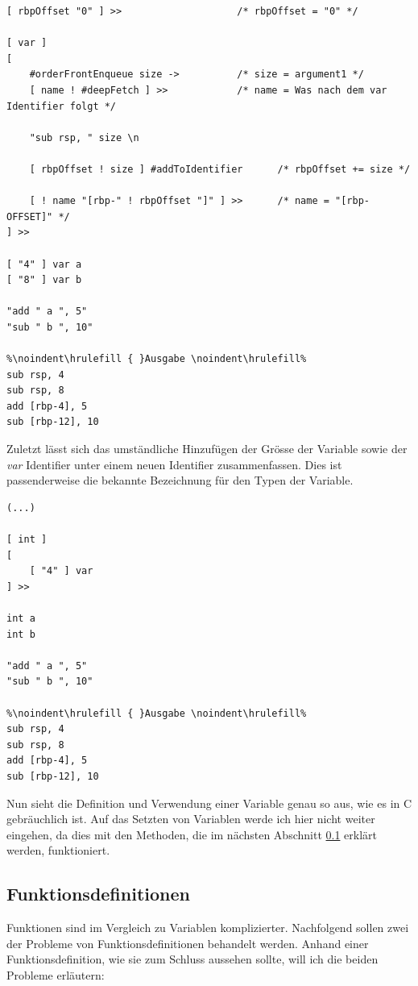 \begin{minipage}{\linewidth}
\begin{lstlisting}[language=QHS, label=eg:qhs-vardefinition, caption=Definition einer Variable mit rbpOffset]
%\noindent\hrulefill { }Eingabe \noindent\hrulefill%
[ rbpOffset "0" ] >>                    /* rbpOffset = "0" */

[ var ]
[
    #orderFrontEnqueue size ->          /* size = argument1 */
    [ name ! #deepFetch ] >>            /* name = Was nach dem var Identifier folgt */

    "sub rsp, " size \n

    [ rbpOffset ! size ] #addToIdentifier      /* rbpOffset += size */

    [ ! name "[rbp-" ! rbpOffset "]" ] >>      /* name = "[rbp-OFFSET]" */
] >> 

[ "4" ] var a 
[ "8" ] var b 

"add " a ", 5"
"sub " b ", 10"
    
%\noindent\hrulefill { }Ausgabe \noindent\hrulefill%
sub rsp, 4
sub rsp, 8
add [rbp-4], 5
sub [rbp-12], 10
\end{lstlisting}
\end{minipage}

Zuletzt lässt sich das umständliche Hinzufügen der Grösse der Variable sowie der \textit{var} Identifier unter einem neuen Identifier zusammenfassen. Dies ist passenderweise die bekannte Bezeichnung für den Typen der Variable.

\begin{lstlisting}[language=QHS, caption=Definition einer Variable mit \textit{int} Identifier]
%\noindent\hrulefill { }Eingabe \noindent\hrulefill%
(...)

[ int ] 
[
    [ "4" ] var
] >>
    
int a 
int b 
    
"add " a ", 5"
"sub " b ", 10"
        
%\noindent\hrulefill { }Ausgabe \noindent\hrulefill%
sub rsp, 4
sub rsp, 8
add [rbp-4], 5
sub [rbp-12], 10
\end{lstlisting}

Nun sieht die Definition und Verwendung einer Variable genau so aus, wie es in C gebräuchlich ist.
Auf das Setzten von Variablen werde ich hier nicht weiter eingehen, da dies mit den Methoden, die im nächsten Abschnitt \ref{sec:qhs-funcs} erklärt werden, funktioniert.

\subsection{Funktionsdefinitionen} \label{sec:qhs-funcs}
Funktionen sind im Vergleich zu Variablen komplizierter. Nachfolgend sollen zwei der Probleme von Funktionsdefinitionen behandelt werden.
Anhand einer Funktionsdefinition, wie sie zum Schluss aussehen sollte, will ich die beiden Probleme erläutern:

